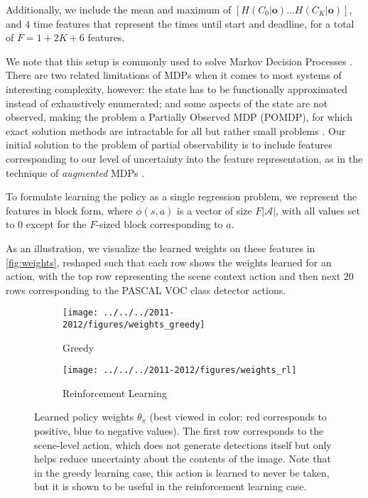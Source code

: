 Additionally, we include the mean and maximum of $[H(C_0|\mathbf{o}) \ldots H(C_K|\mathbf{o})]$, and $4$ time features that represent the times until start and deadline, for a total of $F = 1+2K+6$ features.

We note that this setup is commonly used to solve Markov Decision Processes \cite{Sutton1998}.
There are two related limitations of MDPs when it comes to most systems of interesting complexity, however: the state has to be functionally approximated instead of exhaustively enumerated; and some aspects of the state are not observed, making the problem a Partially Observed MDP (POMDP), for which exact solution methods are intractable for all but rather small problems \cite{Roy2002}.
Our initial solution to the problem of partial observability is to include features corresponding to our level of uncertainty into the feature representation, as in the technique of \emph{augmented} MDPs \cite{Kwok2004}.

To formulate learning the policy as a single regression problem, we represent the features in block form, where $\phi(s,a)$ is a vector of size $F|\mathcal{A}|$, with all values set to $0$ except for the $F$-sized block corresponding to $a$.

As an illustration, we visualize the learned weights on these features in \autoref{fig:weights}, reshaped such that each row shows the weights learned for an action, with the top row representing the scene context action and then next $20$ rows corresponding to the PASCAL VOC class detector actions.

\begin{figure}[h!]
\centering
\begin{subfigure}[t]{0.48\linewidth}
    \texttt{[image: ../../../2011-2012/figures/weights\_greedy]}
    \caption{Greedy}
\end{subfigure}
\begin{subfigure}[t]{0.48\linewidth}
    \texttt{[image: ../../../2011-2012/figures/weights\_rl]}
    \caption{Reinforcement Learning}
\end{subfigure}
\caption{
Learned policy weights $\theta_\pi$ (best viewed in color: red corresponds to positive, blue to negative values).
The first row corresponds to the scene-level action, which does not generate detections itself but only helps reduce uncertainty about the contents of the image.
Note that in the greedy learning case, this action is learned to never be taken, but it is shown to be useful in the reinforcement learning case.
}
\label{fig:weights}
\end{figure}


